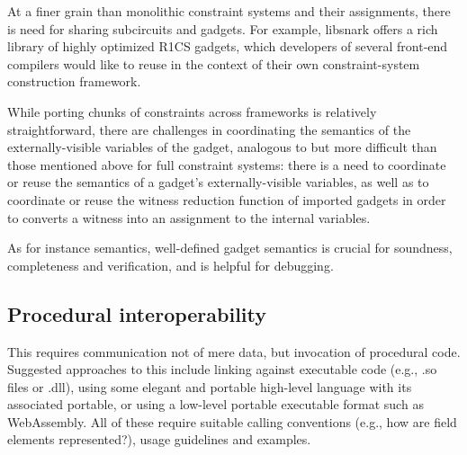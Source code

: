 At a finer grain than monolithic constraint systems and their assignments, there is need for sharing subcircuits and gadgets.
For example, libsnark offers a rich library of highly optimized R1CS gadgets, which developers of several front-end compilers would like to reuse in the context of their own constraint-system construction framework.

While porting chunks of constraints across frameworks is relatively straightforward, there are challenges in coordinating the semantics of the externally-visible variables of the gadget, analogous to but more difficult than those mentioned above for full constraint systems:
there is a need to coordinate or reuse the semantics of a gadget's externally-visible variables, as well as to coordinate or reuse the witness reduction function of imported gadgets in order to converts a witness into an assignment to the internal variables.

As for instance semantics, well-defined gadget semantics is crucial for soundness, completeness and verification, and is helpful for debugging.


\subsection{Procedural interoperability}
\label{implem:interoperability:procedural}


This requires communication not of mere data, but invocation of procedural code. Suggested approaches to this include linking against executable code (e.g., .so files or .dll), using some elegant and portable high-level language with its associated portable, or using a low-level portable executable format such as WebAssembly.
All of these require suitable calling conventions (e.g., how are field elements represented?), usage guidelines and examples.



